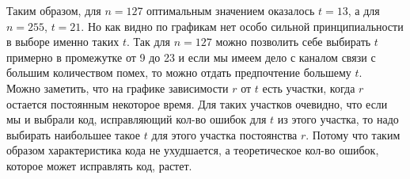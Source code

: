 \documentclass[12pt]{article}
\begin{document}
            Таким образом, для $n = 127$ оптимальным значением оказалось $t = 13$, а для $n = 255$, $t = 21$. Но как видно по графикам нет особо сильной принципиальности в выборе именно таких $t$. Так для $n = 127$ можно позволить себе выбирать $t$ примерно в промежутке от 9 до 23 и если мы имеем дело с каналом связи с большим количеством помех, то можно отдать предпочтение большему $t$. \\

            Можно заметить, что на графике зависимости $r$ от $t$ есть участки, когда $r$ остается постоянным некоторое время. Для таких участков очевидно, что если мы и выбрали код, исправляющий кол-во ошибок для $t$ из этого участка, то надо выбирать наибольшее такое $t$ для этого участка постоянства $r$. Потому что таким образом характеристика кода не ухудшается, а теоретическое кол-во ошибок, которое может исправлять код, растет.

\end{document}
